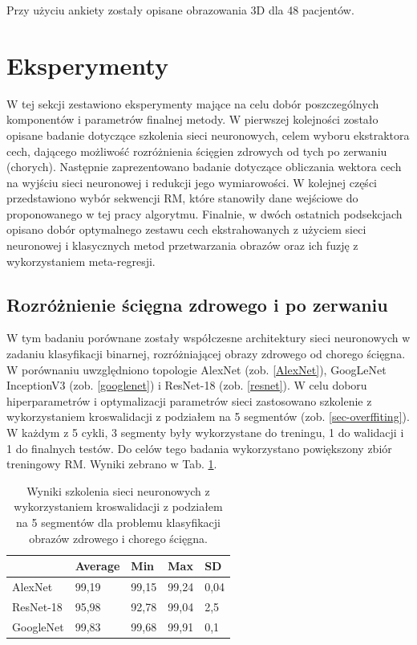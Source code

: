 Przy użyciu ankiety zostały opisane obrazowania 3D dla 48 pacjentów. 

\section{Eksperymenty}

W tej sekcji zestawiono eksperymenty mające na celu dobór poszczególnych komponentów i parametrów finalnej metody. W pierwszej kolejności zostało opisane badanie dotyczące szkolenia sieci neuronowych, celem wyboru ekstraktora cech, dającego możliwość rozróżnienia ścięgien zdrowych od tych po zerwaniu (chorych). Następnie zaprezentowano badanie dotyczące obliczania wektora cech na wyjściu sieci neuronowej i redukcji jego wymiarowości. W kolejnej części przedstawiono wybór sekwencji RM, które stanowiły dane wejściowe do proponowanego w tej pracy algorytmu. Finalnie, w dwóch ostatnich podsekcjach opisano dobór optymalnego zestawu cech ekstrahowanych z użyciem sieci neuronowej i klasycznych metod przetwarzania obrazów oraz ich fuzję z wykorzystaniem meta-regresji.  


\subsection{Rozróżnienie ścięgna zdrowego i po zerwaniu}
\label{binaryMRI}
W tym badaniu porównane zostały współczesne architektury sieci neuronowych w zadaniu klasyfikacji binarnej, rozróżniającej obrazy zdrowego od chorego ścięgna. W porównaniu uwzględniono topologie AlexNet (zob. \ref{AlexNet}), GoogLeNet InceptionV3 (zob. \ref{googlenet}) i ResNet-18 (zob. \ref{resnet}). W celu doboru hiperparametrów i optymalizacji parametrów sieci zastosowano szkolenie z wykorzystaniem kroswalidacji z podziałem na 5 segmentów (zob. \ref{sec-overffiting}). W każdym z 5 cykli, 3 segmenty były wykorzystane do treningu, 1 do walidacji i 1 do finalnych testów. Do celów tego badania wykorzystano powiększony zbiór treningowy RM. Wyniki zebrano w Tab. \ref{tab:binary-cross-validation}.
\begin{table}[h!]
	\setlength{\tabcolsep}{14pt}
	\centering
	\caption{Wyniki szkolenia sieci neuronowych z wykorzystaniem kroswalidacji z podziałem na 5 segmentów dla problemu klasyfikacji obrazów zdrowego i chorego ścięgna.}
	\label{tab:binary-cross-validation}
	\begin{tabular}{l | l | l | l | l }
		 & Average   & Min   & Max   & SD   \\ \hline \hline
		AlexNet   & 99,19 & 99,15 & 99,24 & 0,04 \\ \hline
		ResNet-18 & 95,98 & 92,78 & 99,04 & 2,5  \\ \hline
		GoogleNet & 99,83 & 99,68 & 99,91 & 0,1  \\ %
	\end{tabular}
\end{table}

